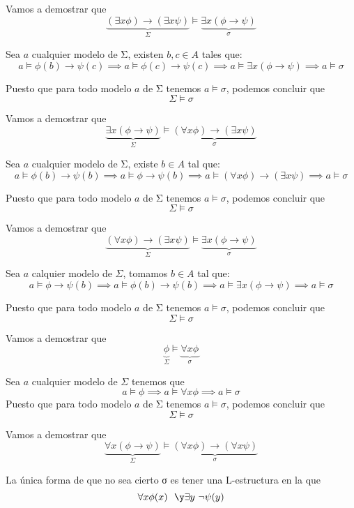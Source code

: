 \begin{problem}
\newpage

\spart  
Vamos a demostrar que
\[\underbrace{(\exists x  \phi )\to  (\exists x \psi)}_{Σ} \models  \underbrace{\exists x (\phi \to \psi)}_{σ}\]

Sea $a$ cualquier modelo de Σ, existen $b,c \in A$ tales que:
\[a \models \phi(b) \to \psi(c) \implies a \models \phi(c) \to \psi(c) \implies a\models \exists x (\phi \to \psi) \implies a \models σ\]

Puesto que para todo modelo $a$ de Σ tenemos $a \models σ$, podemos concluir que
\[Σ \models σ\]

\spart 

Vamos a demostrar que
\[\underbrace{\exists x (\phi \to \psi)}_{Σ} \models \underbrace{(\forall x  \phi ) \to  (\exists x \psi)}_{σ}\]

Sea $a$ cualquier modelo de Σ, existe $b \in A$ tal que:
\[a \models \phi(b) \to \psi(b) \implies a \models \phi \to \psi(b) \implies a\models  (\forall x \phi) \to (\exists x \psi) \implies a \models σ\]

Puesto que para todo modelo $a$ de Σ tenemos $a \models σ$, podemos concluir que
\[Σ \models σ\]

\spart 

Vamos a demostrar que
\[\underbrace{(\forall x  \phi ) \to  (\exists x \psi)}_{Σ} \models \underbrace{ \exists x (\phi  \to \psi)}_{σ} \]

Sea $a$ calquier modelo de $Σ$, tomamos $b\in A$ tal que:
\[a \models \phi \to \psi(b) \implies a \models \phi(b) \to \psi (b) \implies a \models \exists x (\phi \to \psi) \implies a \models σ\]

Puesto que para todo modelo $a$ de Σ tenemos $a \models σ$, podemos concluir que
\[Σ \models σ\]

\spart 

Vamos a demostrar que
\[\underbrace{ \phi }_{Σ} \models \underbrace{ \forall x \phi}_{σ}\]

Sea $a$ cualquier modelo de $Σ$ tenemos que
\[a \models \phi \implies a \models \forall x \phi \implies a \models σ\]
Puesto que para todo modelo $a$ de Σ tenemos $a \models σ$, podemos concluir que
\[Σ \models σ\]

\spart 

Vamos a demostrar que
\[\underbrace{\forall x (\phi \to \psi)}_{Σ} \models \underbrace{(\forall x  \phi )\to  (\forall x \psi)}_{σ}\]

La única forma de que no sea cierto σ es tener una L-estructura en la que
\[\forall x \phi(x) \ \ \y \exists y \ \neg\psi(y)\]


\end{problem}
